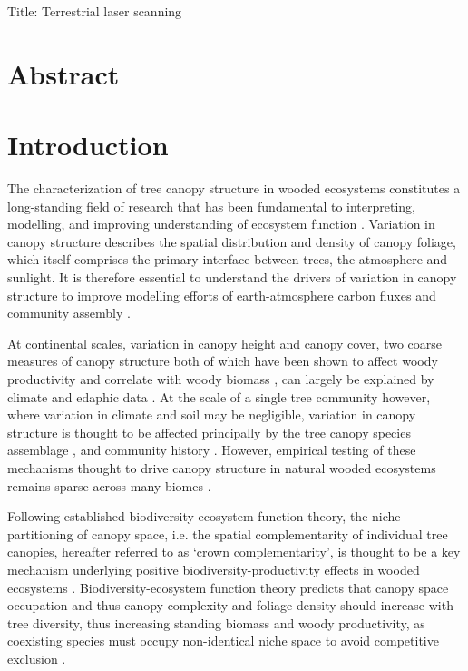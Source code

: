 \documentclass[11pt,a4paper]{article}
\newcommand{\titletext}{Terrestrial laser scanning}
\begin{document}
{\Large{Title: \titletext{}}}


\section*{Abstract}

\section{Introduction}

The characterization of tree canopy structure in wooded ecosystems constitutes a long-standing field of research that has been fundamental to interpreting, modelling, and improving understanding of ecosystem function \citep{Watt1947, Whittaker1969, Horn1971, Maarel1996}. Variation in canopy structure describes the spatial distribution and density of canopy foliage, which itself comprises the primary interface between trees, the atmosphere and sunlight. It is therefore essential to understand the drivers of variation in canopy structure to improve modelling efforts of earth-atmosphere carbon fluxes and community assembly \citep{}. 

At continental scales, variation in canopy height and canopy cover, two coarse measures of canopy structure both of which have been shown to affect woody productivity and correlate with woody biomass \citep{}, can largely be explained by climate and edaphic data \citep{SOME-GEDI}. At the scale of a single tree community however, where variation in climate and soil may be negligible, variation in canopy structure is thought to be affected principally by the tree canopy species assemblage \citep{}, and community history \citep{}. However, empirical testing of these mechanisms thought to drive canopy structure in natural wooded ecosystems remains sparse across many biomes \citep{}.

Following established biodiversity-ecosystem function theory, the niche partitioning of canopy space, i.e. the spatial complementarity of individual tree canopies, hereafter referred to as `crown complementarity', is thought to be a key mechanism underlying positive biodiversity-productivity effects in wooded ecosystems \citep{Pretzsch2014, Barry2019}. Biodiversity-ecosystem function theory predicts that canopy space occupation and thus canopy complexity and foliage density should increase with tree diversity, thus increasing standing biomass and woody productivity, as coexisting species must occupy non-identical niche space to avoid competitive exclusion \citep{}. 
\end{document}

